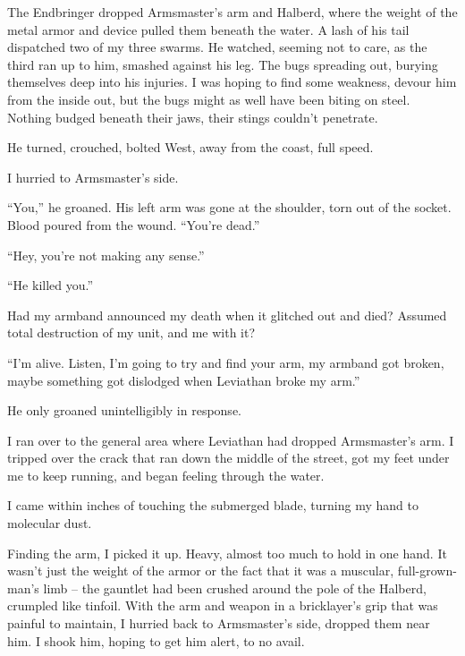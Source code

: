 The Endbringer dropped Armsmaster's arm and Halberd, where the weight of the metal armor and device pulled them beneath the water.  A lash of his tail dispatched two of my three swarms.  He watched, seeming not to care, as the third ran up to him, smashed against his leg.  The bugs spreading out, burying themselves deep into his injuries. I was hoping to find some weakness, devour him from the inside out, but the bugs might as well have been biting on steel.  Nothing budged beneath their jaws, their stings couldn't penetrate.



He turned, crouched, bolted West, away from the coast, full speed.



I hurried to Armsmaster's side.



``You,'' he groaned.  His left arm was gone at the shoulder, torn out of the socket.  Blood poured from the wound.  ``You're dead.''



``Hey, you're not making any sense.''



``He killed you.''



Had my armband announced my death when it glitched out and died?  Assumed total destruction of my unit, and me with it?



``I'm alive.  Listen, I'm going to try and find your arm, my armband got broken, maybe something got dislodged when Leviathan broke my arm.''



He only groaned unintelligibly in response.



I ran over to the general area where Leviathan had dropped Armsmaster's arm.   I tripped over the crack that ran down the middle of the street, got my feet under me to keep running, and began feeling through the water.



I came within inches of touching the submerged blade, turning my hand to molecular dust.



Finding the arm, I picked it up.  Heavy, almost too much to hold in one hand.  It wasn't just the weight of the armor or the fact that it was a muscular, full-grown-man's limb – the gauntlet had been crushed around the pole of the Halberd, crumpled like tinfoil.  With the arm and weapon in a bricklayer's grip that was painful to maintain, I hurried back to Armsmaster's side, dropped them near him.  I shook him, hoping to get him alert, to no avail.



